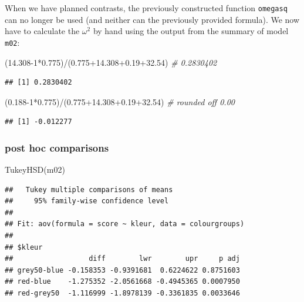 \documentclass[
]{book}
\newenvironment{Shaded}{\begin{snugshade}}{\end{snugshade}}
\newcommand{\CommentTok}[1]{\textcolor[rgb]{0.56,0.35,0.01}{\textit{#1}}}
\newcommand{\DecValTok}[1]{\textcolor[rgb]{0.00,0.00,0.81}{#1}}
\newcommand{\FloatTok}[1]{\textcolor[rgb]{0.00,0.00,0.81}{#1}}
\newcommand{\FunctionTok}[1]{\textcolor[rgb]{0.00,0.00,0.00}{#1}}
\newcommand{\NormalTok}[1]{#1}
\newcommand{\SpecialCharTok}[1]{\textcolor[rgb]{0.00,0.00,0.00}{#1}}
\begin{document}
When we have planned contrasts, the previously constructed function \texttt{omegasq} can no longer be used (and neither can the previously provided formula). We now have to calculate the \(\omega^2\) by hand using the output from the summary of model \texttt{m02}:

\begin{Shaded}
\begin{Highlighting}[]
\NormalTok{(}\FloatTok{14.308}\DecValTok{{-}1}\SpecialCharTok{*}\FloatTok{0.775}\NormalTok{)}\SpecialCharTok{/}\NormalTok{(}\FloatTok{0.775+14.308+0.19+32.54}\NormalTok{) }\CommentTok{\# 0.2830402}
\end{Highlighting}
\end{Shaded}

\begin{verbatim}
## [1] 0.2830402
\end{verbatim}

\begin{Shaded}
\begin{Highlighting}[]
\NormalTok{(}\FloatTok{0.188}\DecValTok{{-}1}\SpecialCharTok{*}\FloatTok{0.775}\NormalTok{)}\SpecialCharTok{/}\NormalTok{(}\FloatTok{0.775+14.308+0.19+32.54}\NormalTok{) }\CommentTok{\# rounded off 0.00}
\end{Highlighting}
\end{Shaded}

\begin{verbatim}
## [1] -0.012277
\end{verbatim}

\hypertarget{r-post-hoc-comparisons}{%
\subsubsection{post hoc comparisons}\label{r-post-hoc-comparisons}}

\begin{Shaded}
\begin{Highlighting}[]
\FunctionTok{TukeyHSD}\NormalTok{(m02)}
\end{Highlighting}
\end{Shaded}

\begin{verbatim}
##   Tukey multiple comparisons of means
##     95% family-wise confidence level
## 
## Fit: aov(formula = score ~ kleur, data = colourgroups)
## 
## $kleur
##                  diff        lwr        upr     p adj
## grey50-blue -0.158353 -0.9391681  0.6224622 0.8751603
## red-blue    -1.275352 -2.0561668 -0.4945365 0.0007950
## red-grey50  -1.116999 -1.8978139 -0.3361835 0.0033646
\end{verbatim}
\end{document}
